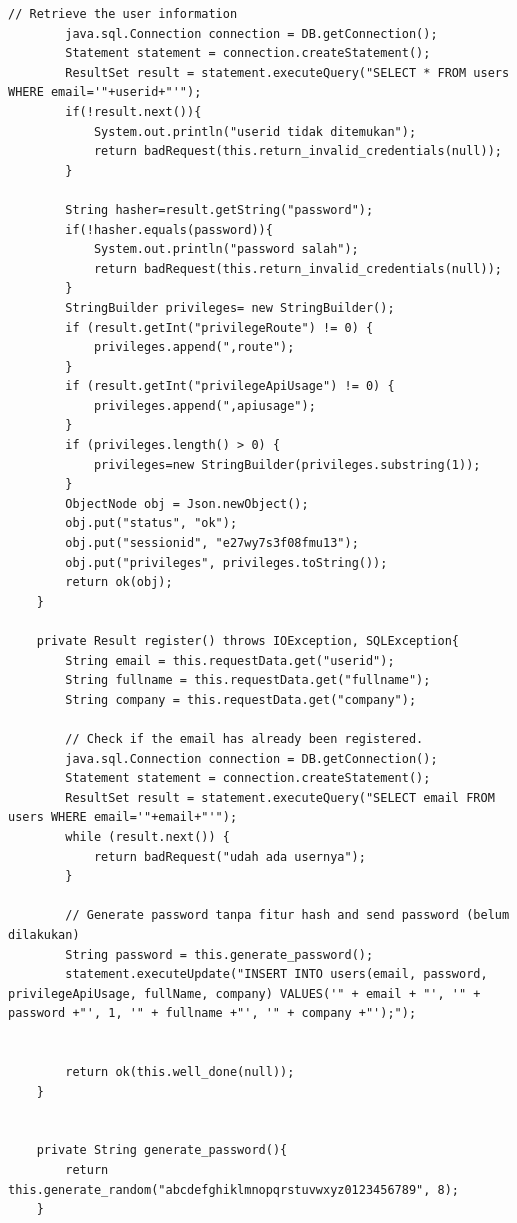 \documentclass[a4paper,twoside]{article}
\begin{document}
\begin{enumerate}
\begin{lstlisting}[caption=Application.java,label={lst:aplication.java}]
        // Retrieve the user information
        java.sql.Connection connection = DB.getConnection();
        Statement statement = connection.createStatement();
        ResultSet result = statement.executeQuery("SELECT * FROM users WHERE email='"+userid+"'");
        if(!result.next()){
            System.out.println("userid tidak ditemukan");
            return badRequest(this.return_invalid_credentials(null));
        }

        String hasher=result.getString("password");
        if(!hasher.equals(password)){
            System.out.println("password salah");
            return badRequest(this.return_invalid_credentials(null));
        }
        StringBuilder privileges= new StringBuilder();
        if (result.getInt("privilegeRoute") != 0) {
            privileges.append(",route");
        }
        if (result.getInt("privilegeApiUsage") != 0) {
            privileges.append(",apiusage");
        }
        if (privileges.length() > 0) {
            privileges=new StringBuilder(privileges.substring(1));
        }
        ObjectNode obj = Json.newObject();
        obj.put("status", "ok");
        obj.put("sessionid", "e27wy7s3f08fmu13");
        obj.put("privileges", privileges.toString());
        return ok(obj);
    }
    
    private Result register() throws IOException, SQLException{
        String email = this.requestData.get("userid");
        String fullname = this.requestData.get("fullname");
        String company = this.requestData.get("company");

        // Check if the email has already been registered.
        java.sql.Connection connection = DB.getConnection();
        Statement statement = connection.createStatement();
        ResultSet result = statement.executeQuery("SELECT email FROM users WHERE email='"+email+"'");
        while (result.next()) {
            return badRequest("udah ada usernya");
        }

        // Generate password tanpa fitur hash and send password (belum dilakukan)
        String password = this.generate_password();
        statement.executeUpdate("INSERT INTO users(email, password, privilegeApiUsage, fullName, company) VALUES('" + email + "', '" + password +"', 1, '" + fullname +"', '" + company +"');");
        

        return ok(this.well_done(null));
    }


    private String generate_password(){
        return this.generate_random("abcdefghiklmnopqrstuvwxyz0123456789", 8);
    }
    

\end{lstlisting}
\end{enumerate}
\end{document}
